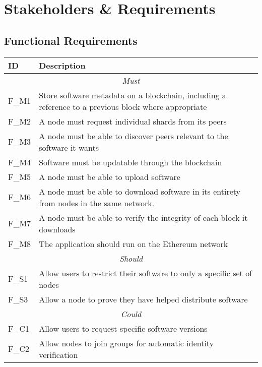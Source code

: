 
\section{Stakeholders \& Requirements}



\subsection{Functional Requirements}

\begin{longtable}{ p{} p{} }
  \toprule
  \textbf{ID} & \textbf{Description}
  \\\midrule\midrule
  \multicolumn{2}{c}{\cellcolor{red!70}\textit{Must}}\\\midrule
  F\_M1 & Store software metadata on a blockchain, including a reference to a previous block where appropriate\\
  F\_M2 & A node must request individual shards from its peers\\
  F\_M3 & A node must be able to discover peers relevant to the software it wants\\
  F\_M4 & Software must be updatable through the blockchain\\
  F\_M5 & A node must be able to upload software\\
  F\_M6 & A node must be able to download software in its entirety from nodes in the same network.\\
  F\_M7 & A node must be able to verify the integrity of each block it downloads\\
  F\_M8 & The application should run on the Ethereum network\\
  \midrule\multicolumn{2}{c}{\cellcolor{orange!70}\textit{Should}}\\\midrule
  F\_S1 & Allow users to restrict their software to only a specific set of nodes\\
  F\_S3 & Allow a node to prove they have helped distribute software\\
  \midrule\multicolumn{2}{c}{\cellcolor{green}\textit{Could}}\\\midrule
  F\_C1 & Allow users to request specific software versions\\
  F\_C2 & Allow nodes to join groups for automatic identity verification\\
  \midrule
  \bottomrule
\end{longtable}

